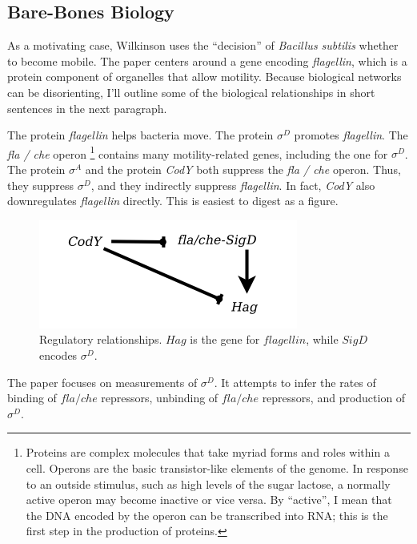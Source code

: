 \documentclass{article}
\begin{document}
\subsection{Bare-Bones Biology}
 As a motivating case, Wilkinson uses the ``decision'' of {\it Bacillus subtilis} whether to become mobile. The paper centers around a gene encoding {\it flagellin}, which is a protein component of organelles that allow motility. Because biological networks can be disorienting, I'll outline some of the biological relationships in short sentences in the next paragraph. 

The protein {\it flagellin} helps bacteria move. The protein $\sigma^D$ promotes {\it flagellin}. The {\it fla / che} operon \footnote{Proteins are complex molecules that take myriad forms and roles within a cell. Operons are the basic transistor-like elements of the genome. In response to an outside stimulus, such as high levels of the sugar lactose, a normally active operon may become inactive or vice versa. By ``active'', I mean that the DNA encoded by the operon can be transcribed into RNA; this is the first step in the production of proteins.} contains many motility-related genes, including the one for $\sigma^D$. The protein $\sigma^A$ and the protein {\it CodY} both suppress the {\it fla / che} operon. Thus, they suppress $\sigma^D$, and they indirectly suppress {\it flagellin}. In fact, {\it CodY} also downregulates {\it flagellin} directly. This is easiest to digest as a figure.

\begin{figure}[h!]
\begin{center}
\includegraphics[scale=0.5]{wilkinson_reg_network.png}
\caption{Regulatory relationships. $Hag$ is the gene for $flagellin$, while $SigD$ encodes $\sigma^D$.}
\end{center}
\label{fig:}
\end{figure}

The paper focuses on measurements of $\sigma^D$. It attempts to infer the rates of binding of $fla/che$ repressors, unbinding of $fla/che$ repressors, and production of $\sigma^D$.
\end{document}

